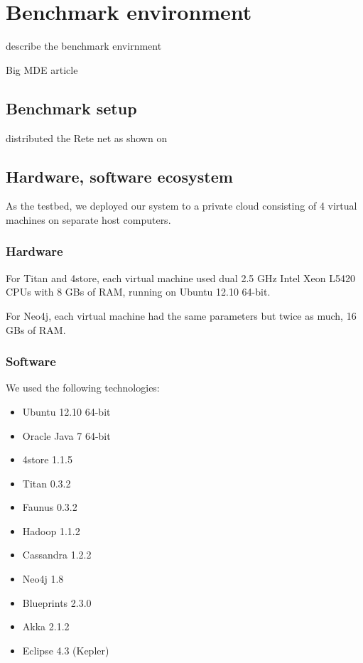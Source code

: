 \section{Benchmark environment}
\label{sec:benchmark-environment}

describe the benchmark envirnment


Big MDE article \cite{Izso:2013:IIG:2487766.2487772}

\subsection{Benchmark setup}


distributed the Rete net as shown on 


\subsection{Hardware, software ecosystem}

As the testbed, we deployed our system to a private cloud consisting of 4 virtual machines on separate host computers. 

\subsubsection{Hardware}
 
For Titan and 4store, each virtual machine used dual 2.5 GHz Intel Xeon L5420 CPUs with 8 GBs of RAM, running on Ubuntu 12.10 64-bit.

For Neo4j, each virtual machine had the same parameters but twice as much, 16 GBs of RAM. 

\subsubsection{Software}

We used the following technologies:

\begin{itemize}
  \item Ubuntu 12.10 64-bit
  \item Oracle Java 7 64-bit
  \item 4store 1.1.5
  \item Titan 0.3.2
  \item Faunus 0.3.2
  \item Hadoop 1.1.2
  \item Cassandra 1.2.2
  \item Neo4j 1.8
  \item Blueprints 2.3.0
  \item Akka 2.1.2
  \item Eclipse 4.3 (Kepler)
\end{itemize}


